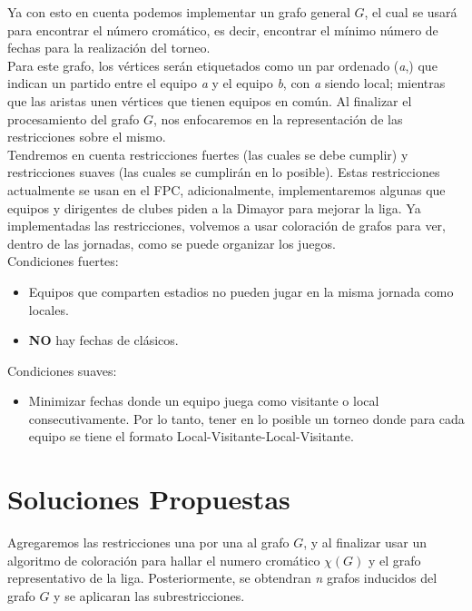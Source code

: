 \documentclass[11pt]{article}
\begin{document}
\begin{multicols}{2}
            Ya con esto en cuenta podemos implementar un grafo general $G$, el cual se usará para 
            encontrar el número cromático, es decir, encontrar el mínimo número de fechas para la 
            realización del torneo.\\
            Para este grafo, los vértices serán etiquetados como un par ordenado (\textit{a},) que indican un 
            partido entre el equipo \textit{a} y el equipo \textit{b}, con \textit{a} siendo local; mientras que las aristas unen 
            vértices que tienen equipos en común. Al finalizar el procesamiento del grafo $G$, nos enfocaremos en la representación de las restricciones
            sobre el mismo.\\[10pt]
            Tendremos en cuenta restricciones fuertes (las cuales se debe cumplir) y restricciones 
            suaves (las cuales se cumplirán en lo posible). Estas restricciones 
            actualmente se usan en el FPC, adicionalmente, implementaremos algunas que equipos y 
            dirigentes de clubes piden a la Dimayor para mejorar la liga. Ya implementadas las 
            restricciones, volvemos a usar coloración de grafos para ver, dentro de las jornadas, como 
            se puede organizar los juegos.\\[10pt]
            Condiciones fuertes:
            \begin{itemize}
                \item Equipos que comparten estadios no pueden jugar en la misma jornada como locales.
                \item \textbf{NO} hay fechas de clásicos.
            \end{itemize}
            Condiciones suaves:
            \begin{itemize}  
                \item Minimizar fechas donde un equipo juega como visitante o local consecutivamente. 
                Por lo tanto, tener en lo posible un torneo donde para cada equipo se tiene 
                el formato Local-Visitante-Local-Visitante.     
            \end{itemize}

        \section{Soluciones Propuestas}
            
            Agregaremos las restricciones una por una al grafo $G$, y al finalizar usar un algoritmo de coloración para hallar el numero cromático $\chi(G)$ y el grafo
            representativo de la liga. Posteriormente, se obtendran \textit{n} grafos inducidos del grafo $G$ y se aplicaran las subrestricciones. 
           
            
        
        

    \end{multicols}
\end{document}
